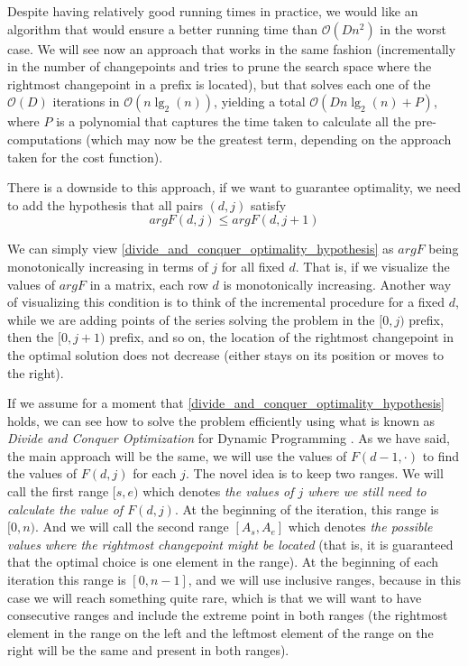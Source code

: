 \documentclass[pdflatex,sn-mathphys]{sn-jnl}%
\theoremstyle{thmstyleone}%
\theoremstyle{thmstyletwo}%
\theoremstyle{thmstylethree}%
\begin{document}
Despite having relatively good running times in practice, we would like an algorithm that would ensure a better running time than $\mathcal{O}(Dn^2)$ in the worst case. We will see now an approach that works in the same fashion (incrementally in the number of changepoints and tries to prune the search space where the rightmost changepoint in a prefix is located), but that solves each one of the $\mathcal{O}(D)$ iterations in $\mathcal{O}\left (n\lg_2(n) \right )$, yielding a total $\mathcal{O}(Dn\lg_2(n) + P)$, where $P$ is a polynomial that captures the time taken to calculate all the pre-computations (which may now be the greatest term, depending on the approach taken for the cost function). 

There is a downside to this approach, if we want to guarantee optimality, we need to add the hypothesis that all pairs $(d,j)$ satisfy
\begin{equation}
    argF(d,j) \leq argF(d,j+1)
    \label{divide_and_conquer_optimality_hypothesis}
\end{equation}

We can simply view \ref{divide_and_conquer_optimality_hypothesis} as $argF$ being monotonically increasing in terms of $j$ for all fixed $d$. That is, if we visualize the values of $argF$ in a matrix, each row $d$ is monotonically increasing. Another way of visualizing this condition is to think of the incremental procedure for a fixed $d$, while we are adding points of the series solving the problem in the $[0,j)$ prefix, then the $[0, j+1)$ prefix, and so on, the location of the rightmost changepoint in the optimal solution does not decrease (either stays on its position or moves to the right).

If we assume for a moment that \ref{divide_and_conquer_optimality_hypothesis} holds, we can see how to solve the problem efficiently using what is known as \textit{Divide and Conquer Optimization} for Dynamic Programming \citep{laaksonen}. As we have said, the main approach will be the same, we will use the values of $F(d-1,\cdot)$ to find the values of $F(d,j)$ for each $j$. The novel idea is to keep two ranges. We will call the first range $[s,e)$ which denotes \textit{the values of $j$ where we still need to calculate the value of $F(d,j)$}. At the beginning of the iteration, this range is $[0,n)$. And we will call the second range $[A_s, A_e]$ which denotes \textit{the possible values where the rightmost changepoint might be located} (that is, it is guaranteed that the optimal choice is one element in the range). At the beginning of each iteration this range is $[0,n-1]$, and we will use inclusive ranges, because in this case we will reach something quite rare, which is that we will want to have consecutive ranges and include the extreme point in both ranges (the rightmost element in the range on the left and the leftmost element of the range on the right will be the same and present in both ranges).  
\end{document}
